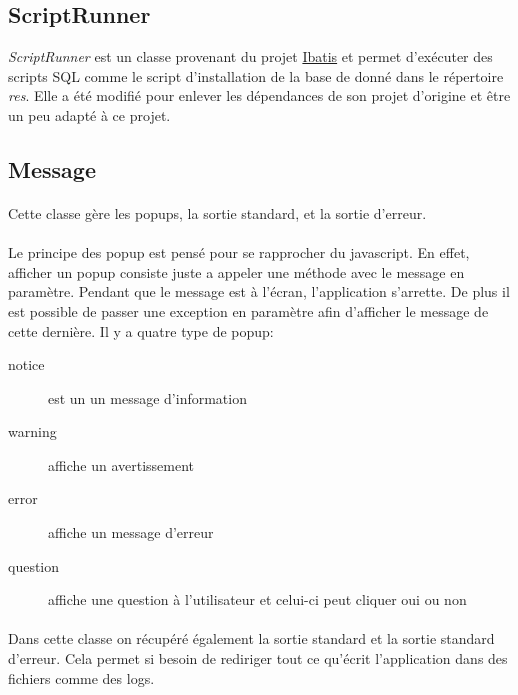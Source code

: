 \documentclass[a4paper,10pt]{report}
\begin{document}
		\subsection{ScriptRunner}

			\textit{ScriptRunner} est un classe provenant du projet \href{http://ibatis.apache.org/}{Ibatis} et permet d’exécuter des scripts SQL comme le script d'installation de la base de donné dans le répertoire \textit{res}. Elle a été modifié pour enlever les dépendances de son projet d'origine et être un peu adapté à ce projet.

		\subsection{Message}

			\paragraph*{}
			Cette classe gère les popups, la sortie standard, et la sortie d’erreur.

			\paragraph*{}
			Le principe des popup est pensé pour se rapprocher du javascript. En effet, afficher un popup consiste juste a appeler une méthode avec le message en paramètre. Pendant que le message est à l’écran, l'application s'arrette. De plus il est possible de passer une exception en paramètre afin d'afficher le message de cette dernière.
			Il y a quatre type de popup:
			\begin{description}
				\item[notice] est un un message d'information
				\item[warning] affiche un avertissement
				\item[error] affiche un message d'erreur
				\item[question] affiche une question à l'utilisateur et celui-ci peut cliquer oui ou non 
			\end{description}

			\paragraph*{}
			Dans cette classe on récupéré également la sortie standard  et la sortie standard d’erreur. Cela permet si besoin de rediriger tout ce qu’écrit l'application dans des fichiers comme des logs.
\end{document}
